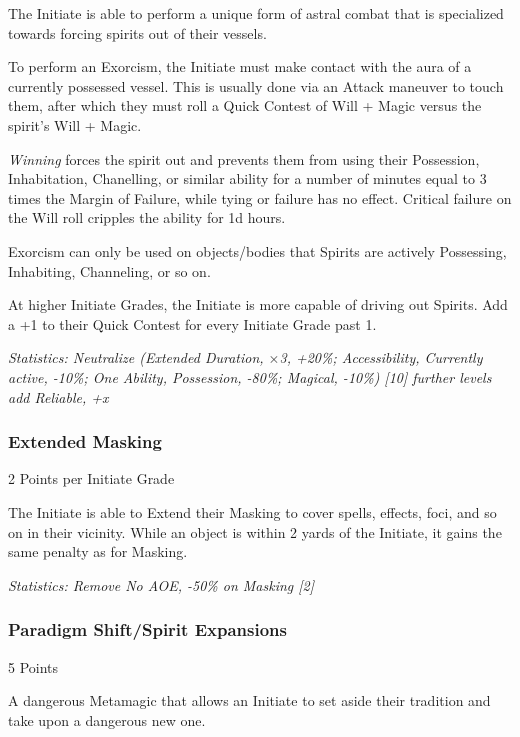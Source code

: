 \begin{multicols}{3}
	The Initiate is able to perform a unique form of astral combat that is specialized towards forcing spirits out of their vessels. 
	
	To perform an Exorcism, the Initiate must make contact with the aura of a currently possessed vessel. This is usually done via an Attack maneuver to touch them, after which they must roll a Quick Contest of Will + Magic versus the spirit's Will + Magic. 
	
	\textit{Winning} forces the spirit out and prevents them from using their Possession, Inhabitation, Chanelling, or similar ability for a number of minutes equal to 3 times the Margin of Failure, while tying or failure has no effect. Critical failure on the Will roll cripples the ability for 1d hours.
	
	Exorcism can only be used on objects/bodies that Spirits are actively Possessing, Inhabiting, Channeling, or so on.
	
	At higher Initiate Grades, the Initiate is more capable of driving out Spirits. Add a +1 to their Quick Contest for every Initiate Grade past 1.
	
	\textcolor{OliveGreen}{\textit{Statistics: Neutralize (Extended Duration, $\times$3, +20\%; Accessibility, Currently active, -10\%; One Ability, Possession, -80\%; Magical, -10\%) [10] further levels add Reliable, +x }}
	
	\subsubsection{Extended Masking}
	\begin{flushright}
		2 Points per Initiate Grade
	\end{flushright}

	The Initiate is able to Extend their Masking to cover spells, effects, foci, and so on in their vicinity. While an object is within 2 yards of the Initiate, it gains the same penalty as for Masking.
	
	\textcolor{OliveGreen}{\textit{Statistics: Remove No AOE, -50\% on Masking [2] }}
	
	\subsubsection{Paradigm Shift/Spirit Expansions}
	\begin{flushright}
		5 Points
	\end{flushright}

	A dangerous Metamagic that allows an Initiate to set aside their tradition and take upon a dangerous new one. %
	

\end{multicols}
